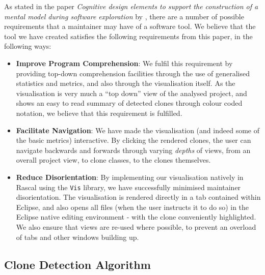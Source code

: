\documentclass{article}
\begin{document}
As stated in the paper \textit{Cognitive design elements to support the construction of a mental model during software exploration} by \citeauthor{Storey1999171}, there are a number of possible requirements that a maintainer may have of a software tool. We believe that the tool we have created satisfies the following requirements\cite{Storey1999171} from this paper, in the following ways:

\begin{itemize}
\item \textbf{Improve Program Comprehension}: We fulfil this requirement by providing top-down comprehension facilities through the use of generalised statistics and metrics, and also through the visualisation itself. As the visualisation is very much a ``top down'' view of the analysed project, and shows an easy to read summary of detected clones through colour coded notation, we believe that this requirement is fulfilled.
\item \textbf{Facilitate Navigation}: We have made the visualisation (and indeed some of the basic metrics) interactive. By clicking the rendered clones, the user can navigate backwards and forwards through varying \textit{depths} of views, from an overall project view, to clone classes, to the clones themselves.
\item \textbf{Reduce Disorientation}: By implementing our visualisation natively in Rascal using the \texttt{Vis} library, we have successfully minimised maintainer disorientation. The visualisation is rendered directly in a tab contained within Eclipse, and also opens all files (when the user instructs it to do so) in the Eclipse native editing environment - with the clone conveniently highlighted. We also ensure that views are re-used where possible, to prevent an overload of tabs and other windows building up.
\end{itemize}

\subsection{Clone Detection Algorithm}
\end{document}
